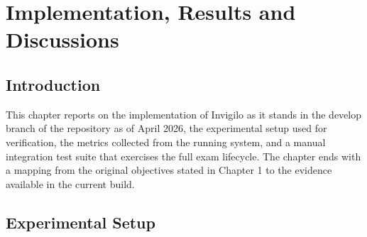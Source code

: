\documentclass[12pt, a4paper]{report}
\begin{document}
\chapter{Implementation, Results and Discussions}

\section{Introduction}

\begin{justify}
  {\fontsize{12}{18}\selectfont
    This chapter reports on the implementation of Invigilo as it stands in the develop branch of the repository as of April 2026, the experimental setup used for verification, the metrics collected from the running system, and a manual integration test suite that exercises the full exam lifecycle. The chapter ends with a mapping from the original objectives stated in Chapter 1 to the evidence available in the current build.
  }
\end{justify}

\section{Experimental Setup}
\end{document}
